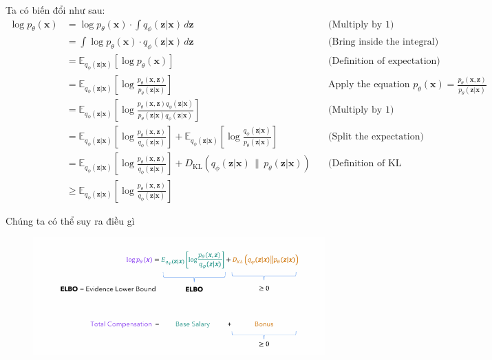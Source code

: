 \documentclass{book}
\begin{document}
Ta có biến đổi như sau:
\begin{align*}
\log p_\theta(\mathbf{x}) 
&= \log p_\theta(\mathbf{x}) \cdot \int q_\phi(\mathbf{z}|\mathbf{x}) \, d\mathbf{z} \quad &\text{(Multiply by 1)} \\
&= \int \log p_\theta(\mathbf{x}) \cdot q_\phi(\mathbf{z}|\mathbf{x}) \, d\mathbf{z} \quad &\text{(Bring inside the integral)} \\
&= \mathbb{E}_{q_\phi(\mathbf{z}|\mathbf{x})}[\log p_\theta(\mathbf{x})] \quad &\text{(Definition of expectation)} \\
&= \mathbb{E}_{q_\phi(\mathbf{z}|\mathbf{x})} \left[ \log \frac{p_\theta(\mathbf{x}, \mathbf{z})}{p_\theta(\mathbf{z}|\mathbf{x})} \right] \quad &\text{Apply the equation } p_\theta(\mathbf{x}) = \frac{p_\theta(\mathbf{x}, \mathbf{z})}{p_\theta(\mathbf{z}|\mathbf{x})} \\
&= \mathbb{E}_{q_\phi(\mathbf{z}|\mathbf{x})} \left[ \log \frac{p_\theta(\mathbf{x}, \mathbf{z}) q_\phi(\mathbf{z}|\mathbf{x})}{p_\theta(\mathbf{z}|\mathbf{x}) q_\phi(\mathbf{z}|\mathbf{x})} \right] \quad &\text{(Multiply by 1)} \\
&= \mathbb{E}_{q_\phi(\mathbf{z}|\mathbf{x})} \left[ \log \frac{p_\theta(\mathbf{x}, \mathbf{z})}{q_\phi(\mathbf{z}|\mathbf{x})} \right] + \mathbb{E}_{q_\phi(\mathbf{z}|\mathbf{x})} \left[ \log \frac{q_\phi(\mathbf{z}|\mathbf{x})}{p_\theta(\mathbf{z}|\mathbf{x})} \right] \quad &\text{(Split the expectation)} \\
&= \mathbb{E}_{q_\phi(\mathbf{z}|\mathbf{x})} \left[ \log \frac{p_\theta(\mathbf{x}, \mathbf{z})}{q_\phi(\mathbf{z}|\mathbf{x})} \right] + D_{\mathrm{KL}}\left(q_\phi(\mathbf{z}|\mathbf{x}) \,\|\, p_\theta(\mathbf{z}|\mathbf{x})\right) \quad &\text{(Definition of KL divergence)} \\
&\geq \mathbb{E}_{q_\phi(\mathbf{z}|\mathbf{x})} \left[ \log \frac{p_\theta(\mathbf{x}, \mathbf{z})}{q_\phi(\mathbf{z}|\mathbf{x})} \right]
\end{align*}

Chúng ta có thể suy ra điều gì

\begin{figure}[H]
    \centering
    \includegraphics[width=0.75\linewidth]{images/VAE_kf1.png}
\end{figure}
\end{document}
